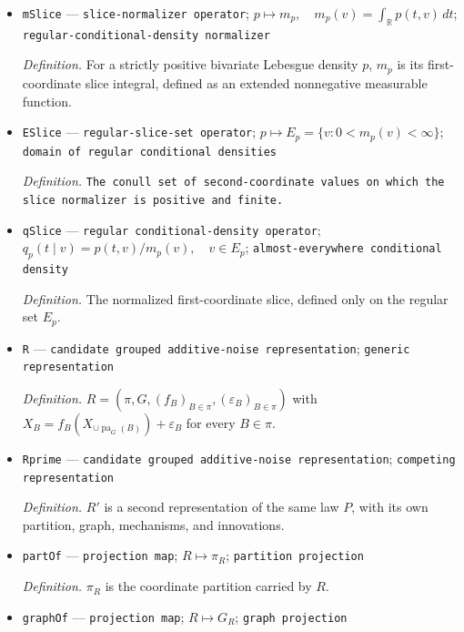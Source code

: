 \documentclass{article}
\begin{document}
\begin{itemize}
  \par\smallskip\noindent\emph{Definition.} \texttt{The log-\allowbreak{}density of each block innovation.}
  \item \texttt{mSlice} --- \texttt{slice-\allowbreak{}normalizer operator}; \(p\mapsto m_p,\quad m_p(v)=\int_{\mathbb R}p(t,v)\,dt\); \texttt{regular-\allowbreak{}conditional-\allowbreak{}density normalizer}
  \par\smallskip\noindent\emph{Definition.} For a strictly positive bivariate Lebesgue density \(p\), \(m_p\) is its first-coordinate slice integral, defined as an extended nonnegative measurable function.
  \item \texttt{ESlice} --- \texttt{regular-\allowbreak{}slice-\allowbreak{}set operator}; \(p\mapsto E_p=\{v:0<m_p(v)<\infty\}\); \texttt{domain of regular conditional densities}
  \par\smallskip\noindent\emph{Definition.} \texttt{The conull set of second-\allowbreak{}coordinate values on which the slice normalizer is positive and finite.}
  \item \texttt{qSlice} --- \texttt{regular conditional-\allowbreak{}density operator}; \(q_p(t\mid v)=p(t,v)/m_p(v),\quad v\in E_p\); \texttt{almost-\allowbreak{}everywhere conditional density}
  \par\smallskip\noindent\emph{Definition.} The normalized first-coordinate slice, defined only on the regular set \(E_p\).
  \item \texttt{R} --- \texttt{candidate grouped additive-\allowbreak{}noise representation}; \texttt{generic representation}
  \par\smallskip\noindent\emph{Definition.} \(R=(\pi,G,(f_B)_{B\in\pi},(\varepsilon_B)_{B\in\pi})\) with \(X_B=f_B(X_{\cup\operatorname{pa}_G(B)})+\varepsilon_B\) for every \(B\in\pi\).
  \item \texttt{Rprime} --- \texttt{candidate grouped additive-\allowbreak{}noise representation}; \texttt{competing representation}
  \par\smallskip\noindent\emph{Definition.} \(R'\) is a second representation of the same law \(P\), with its own partition, graph, mechanisms, and innovations.
  \item \texttt{partOf} --- \texttt{projection map}; \(R\mapsto\pi_R\); \texttt{partition projection}
  \par\smallskip\noindent\emph{Definition.} \(\pi_R\) is the coordinate partition carried by \(R\).
  \item \texttt{graphOf} --- \texttt{projection map}; \(R\mapsto G_R\); \texttt{graph projection}

\end{itemize}
\end{document}
